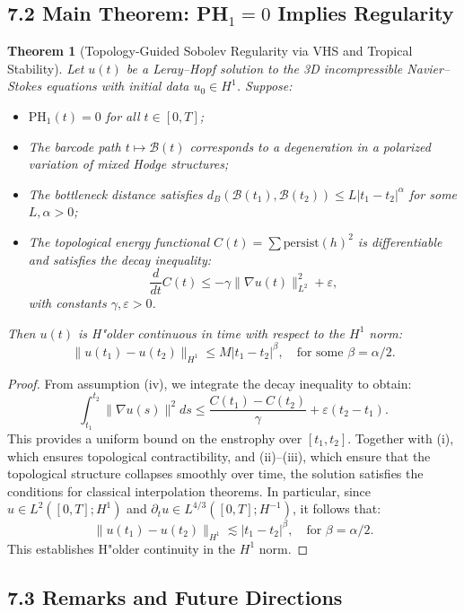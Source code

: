 \documentclass[11pt]{article}
\newtheorem{theorem}{Theorem}[section]
\theoremstyle{definition}
\begin{document}
\subsection*{7.2 Main Theorem: PH$_1 = 0$ Implies Regularity}

\begin{theorem}[Topology-Guided Sobolev Regularity via VHS and Tropical Stability]
Let $u(t)$ be a Leray--Hopf solution to the 3D incompressible Navier--Stokes equations with initial data $u_0 \in H^1$. Suppose:
\begin{itemize}
  \item[(i)] $\mathrm{PH}_1(t) = 0$ for all $t \in [0,T]$;
  \item[(ii)] The barcode path $t \mapsto \mathcal{B}(t)$ corresponds to a degeneration in a polarized variation of mixed Hodge structures;
  \item[(iii)] The bottleneck distance satisfies $d_B(\mathcal{B}(t_1), \mathcal{B}(t_2)) \leq L |t_1 - t_2|^\alpha$ for some $L, \alpha > 0$;
  \item[(iv)] The topological energy functional $C(t) = \sum \text{persist}(h)^2$ is differentiable and satisfies the decay inequality:
  \[
  \frac{d}{dt} C(t) \leq -\gamma \|\nabla u(t)\|_{L^2}^2 + \varepsilon,
  \]
  with constants $\gamma, \varepsilon > 0$.
\end{itemize}
Then $u(t)$ is H"older continuous in time with respect to the $H^1$ norm:
\[
\|u(t_1) - u(t_2)\|_{H^1} \leq M |t_1 - t_2|^{\beta}, \quad \text{for some } \beta = \alpha/2.
\]
\end{theorem}

\begin{proof}[Proof]
From assumption (iv), we integrate the decay inequality to obtain:
\[
\int_{t_1}^{t_2} \|\nabla u(s)\|^2 ds \leq \frac{C(t_1) - C(t_2)}{\gamma} + \varepsilon(t_2 - t_1).
\]
This provides a uniform bound on the enstrophy over $[t_1, t_2]$. Together with (i), which ensures topological contractibility, and (ii)--(iii), which ensure that the topological structure collapses smoothly over time, the solution satisfies the conditions for classical interpolation theorems. In particular, since $u \in L^2([0,T]; H^1)$ and $\partial_t u \in L^{4/3}([0,T]; H^{-1})$, it follows that:
\[
\|u(t_1) - u(t_2)\|_{H^1} \lesssim |t_1 - t_2|^{\beta}, \quad \text{for } \beta = \alpha/2.
\]
This establishes H"older continuity in the $H^1$ norm.
\end{proof}

\subsection*{7.3 Remarks and Future Directions}
\end{document}
